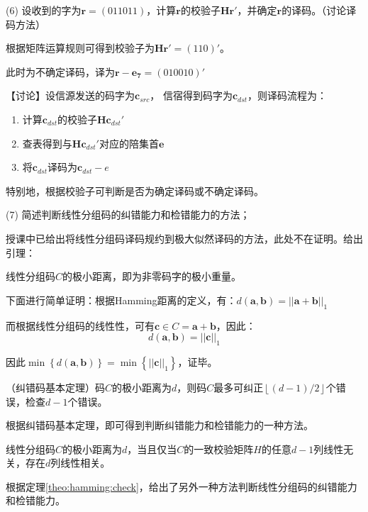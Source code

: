 (6) 设收到的字为$\bm{r}=(011011)$，计算$\bm{r}$的校验子$\bm{Hr}'$，并确定$\bm{r}$的译码。（讨论译码方法）

\begin{Solution}
根据矩阵运算规则可得到校验子为$\bm{Hr}' = (110)'$。
    
    此时为不确定译码，译为$\bm{r}-\bm{e_7} = (010010)'$

    【讨论】设信源发送的码字为$\bm{c}_{src}$，    
    信宿得到码字为$\bm{c}_{dst}$，则译码流程为：

    \begin{enumerate}
        \item 计算$\bm{c}_{dst}$的校验子$\bm{H}\bm{c}_{dst}'$
        \item 查表得到与$\bm{H}\bm{c}_{dst}'$对应的陪集首$\bm{e}$
        \item 将$\bm{c}_{dst}$译码为$\bm{c}_{dst}-e$
    \end{enumerate}

    特别地，根据校验子可判断是否为确定译码或不确定译码。
\end{Solution}


(7) 简述判断线性分组码的纠错能力和检错能力的方法；

\begin{Solution}
    授课中已给出将线性分组码译码规约到极大似然译码的方法，此处不在证明。给出引理：

    \begin{lemma}
        线性分组码$C$的极小距离，即为非零码字的极小重量。
    \end{lemma}

    下面进行简单证明：根据Hamming距离的定义，有：$d(\bm{a},\bm{b}) = ||\bm{a} + \bm{b}||_1 $

    而根据线性分组码的线性性，可有$\bm{c} \in C = \bm{a} + \bm{b}$，因此：
    \begin{equation}
        d(\bm{a},\bm{b}) = ||\bm{c}||_1
    \end{equation}

    因此$\min \left\{d(\bm{a},\bm{b})\right\} = \min \left\{||\bm{c}||_1\right\}$，证毕。

    \begin{theorem}
        （纠错码基本定理）码$C$的极小距离为$d$，则码$C$最多可纠正$\left\lfloor (d-1)/2\right\rfloor $个错误，检查$d-1$个错误。
    \end{theorem}

    根据纠错码基本定理，即可得到判断纠错能力和检错能力的一种方法。

    \begin{theorem}
        \label{theo:hamming:check}
        线性分组码$C$的极小距离为$d$，当且仅当$C$的一致校验矩阵$H$的任意$d-1$列线性无关，存在$d$列线性相关。
    \end{theorem}

    根据定理\ref{theo:hamming:check}，给出了另外一种方法判断线性分组码的纠错能力和检错能力。
\end{Solution}

